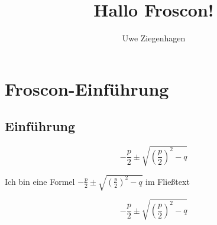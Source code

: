 \documentclass[ngerman]{scrreprt}
\title{Hallo Froscon!}
\author{Uwe Ziegenhagen}
\begin{document}
\maketitle

\tableofcontents

\chapter{Froscon-Einführung}

\section{Einführung}

\begin{equation}
-\frac{p}{2} \pm \sqrt{ \left(\frac{p}{2}\right)^2 -q }
\end{equation}


Ich bin eine Formel \(-\frac{p}{2} \pm \sqrt{ \left(\frac{p}{2}\right)^2 -q }\) im Fließtext

\[-\frac{p}{2} \pm \sqrt{ \left(\frac{p}{2}\right)^2 -q }\]
\end{document}
